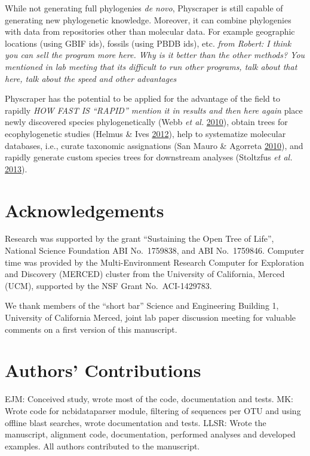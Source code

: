 \documentclass[]{article}
\begin{document}
While not generating full phylogenies \emph{de novo}, Physcraper is still capable of generating new phylogenetic knowledge.
Moreover, it can combine phylogenies with data from repositories other than molecular data. For example geographic locations (using GBIF ids), fossils (using PBDB ids), etc. \emph{from Robert: I think you can sell the program more here. Why is it better than the other methods? You mentioned in lab meeting that its difficult to run other programs, talk about that here, talk about the speed and other advantages}

Physcraper has the potential to be applied for the advantage of the field to rapidly \emph{HOW FAST IS ``RAPID'' mention it in results and then here again}
place newly discovered species phylogenetically (Webb \emph{et al.} \protect\hyperlink{ref-webb2010biodiversity}{2010}),
obtain trees for ecophylogenetic studies (Helmus \& Ives \protect\hyperlink{ref-helmus2012phylogenetic}{2012}),
help to systematize molecular databases, i.e., curate taxonomic assignations (San Mauro \& Agorreta \protect\hyperlink{ref-san2010molecular}{2010}),
and rapidly generate custom species trees for downstream analyses (Stoltzfus \emph{et al.} \protect\hyperlink{ref-stoltzfus2013phylotastic}{2013}).

\hypertarget{acknowledgements}{%
\section{Acknowledgements}\label{acknowledgements}}

Research was supported by the grant ``Sustaining the Open Tree of Life'', National Science Foundation ABI No.~1759838, and ABI No.~1759846.
Computer time was provided by the Multi-Environment Research Computer for Exploration and Discovery (MERCED) cluster from the University of California, Merced (UCM), supported by the NSF Grant No.~ACI-1429783.

We thank members of the ``short bar'' Science and Engineering Building 1, University of California Merced, joint lab paper discussion meeting for valuable comments on a first version of this manuscript.

\hypertarget{authors-contributions}{%
\section{Authors' Contributions}\label{authors-contributions}}

EJM: Conceived study, wrote most of the code, documentation and tests.
MK: Wrote code for ncbidataparser module, filtering of sequences per OTU and using offline blast searches, wrote documentation and tests.
LLSR: Wrote the manuscript, alignment code, documentation, performed analyses and developed examples.
All authors contributed to the manuscript.
\end{document}
